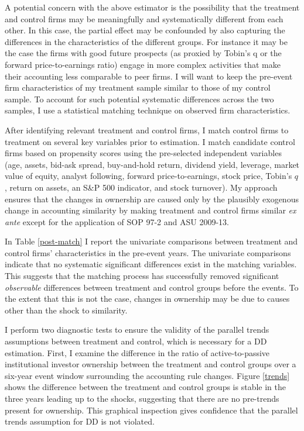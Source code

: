 \documentclass[thesis]{thesis-umich}
\begin{document}
A potential concern with the above estimator is the possibility that the treatment and control firms may be meaningfully and systematically different from each other. In this case, the partial effect may be confounded by also capturing the differences in the characteristics of the different groups. For instance it may be the case the firms with good future prospects (as proxied by Tobin’s q or the forward price-to-earnings ratio) engage in more complex activities that make their accounting less comparable to peer firms. I will want to keep the pre-event firm characteristics of my treatment sample similar to those of my control sample. To account for such potential systematic differences across the two samples, I use a statistical matching technique on observed firm characteristics. 

After identifying relevant treatment and control firms, I match control firms to treatment on several key variables prior to estimation. I match candidate control firms based on propensity scores using the pre-selected independent variables (age, assets, bid-ask spread, buy-and-hold return, dividend yield, leverage, market value of equity, analyst following, forward price-to-earnings, stock price, Tobin’s $q$, return on assets, an S\&P 500 indicator, and stock turnover). My approach ensures that the changes in ownership are caused only by the plausibly exogenous change in accounting similarity by making treatment and control firms similar \emph{ex ante} except for the application of SOP 97-2 and ASU 2009-13.

In Table \ref{post-match} I report the univariate comparisons between treatment and control firms' characteristics in the pre-event years. The univariate comparisons indicate that no systematic significant differences exist in the matching variables. This suggests that the matching process has successfully removed significant \emph{observable} differences between treatment and control groups before the events. To the extent that this is not the case, changes in ownership may be due to causes other than the shock to similarity.

I perform two diagnostic tests to ensure the validity of the parallel trends assumptions between treatment and control, which is necessary for a DD estimation. First, I examine the difference in the ratio of active-to-passive institutional investor ownership between the treatment and control groups over a six-year event window surrounding the accounting rule changes. Figure \ref{trends} shows the difference between the treatment and control groups is stable in the three years leading up to the shocks, suggesting that there are no pre-trends present for ownership. This graphical inspection gives confidence that the parallel trends assumption for DD is not violated.
\end{document}
